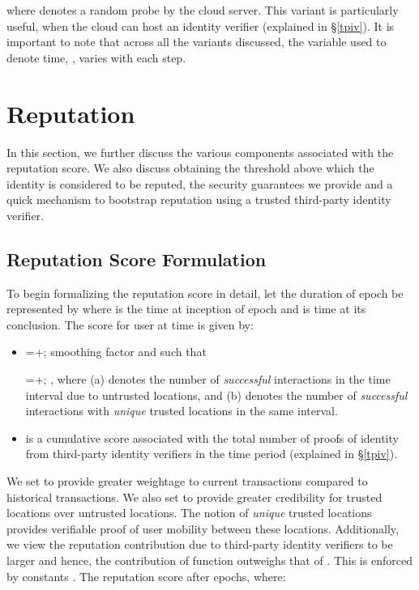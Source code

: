 \documentclass[letterpaper,twocolumn]{sig-alternate}
\begin{document}
where  denotes a random probe by the cloud server. This variant is particularly useful, when the cloud can host an identity verifier (explained in \S \ref{tpiv}). It is important to note that across all the variants discussed, the variable used to denote time, , varies with each step. 
 \section{Reputation}
\label{reputation}

In this section, we further discuss the various components associated with the reputation score. We also discuss obtaining the threshold above which the identity is considered to be reputed, the security guarantees we provide and a quick mechanism to bootstrap reputation using a trusted third-party identity verifier. 

\subsection{Reputation Score Formulation}
\label{formulation}

To begin formalizing the reputation score in detail, let the duration of epoch  be represented by  where  is the time at inception of epoch  and  is time at its conclusion. The score for user  at time  is given by:

\vspace{1.5mm}
\framebox{\large {\centerline{\textbf{ =  + }}}}

\vspace{1mm}
\begin{itemize}[leftmargin=-.01in]
\itemsep-0.23em 
\item =+; smoothing factor  and  such that

=+; , where (a)  denotes the number of \textit{successful} interactions in the time interval  due to untrusted locations, and (b)  denotes the number of \textit{successful} interactions with \textit{unique} trusted locations in the same interval. 

\item  is a cumulative score associated with the total number of proofs of identity from third-party identity verifiers in the time period  (explained in \S \ref{tpiv}). 

\end{itemize}
\vspace{-2mm}

We set  to provide greater weightage to current transactions compared to historical transactions. We also set  to provide greater credibility for trusted locations over untrusted locations. The notion of {\em unique} trusted locations provides verifiable proof of user mobility between these locations. Additionally, we view the reputation contribution due to third-party identity verifiers to be larger and hence, the contribution of function  outweighs that of . This is enforced by constants . 
The reputation score after  epochs,  where:
\end{document}
